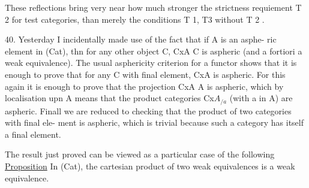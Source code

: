 These reflections bring very near how much stronger the  strictness
requiement T 2 for test categories, than merely the conditions T 1, T3
without T 2 .

40. Yesterday I incidentally made use of the fact that if A is an asphe-%
ric element in (Cat), thn for any other object C, CxA \hand{\ensuremath{\longrightarrow}} C is aspheric
(and a fortiori a weak equivalence). The usual asphericity criterion for a
functor shows that it is enough to prove that for any C with final element,
CxA is aspheric.  For this again it is enough to prove that the
projection CxA \hand{\ensuremath{\longrightarrow}} A is aspheric, which by localisation upn A means that
the product categories  Cx\hand{(}$A_{/a}$\hand{)} (with a in A) are aspheric. Finall we
are reduced to checking that the product of two categories with final ele-%
ment is aspheric, which is trivial because such a category has itself a
final element.

The result just proved can be viewed as a particular case of the
following
\uline{Proposition} In (Cat), the cartesian product of two weak equivalences is
a weak equivalence.
